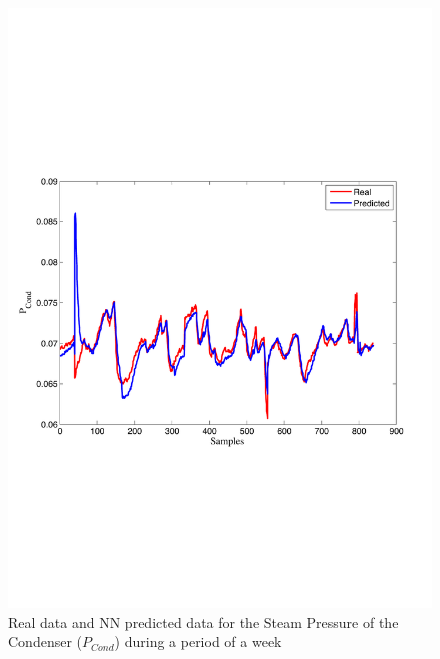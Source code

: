 \begin{figure}
\includegraphics[width=1\textwidth]{nne0bis.pdf}
\caption{Real data and NN predicted data for the Steam Pressure of the Condenser  ($P_{Cond}$) during a period of a week}
\label{Pcond}
\end{figure}

